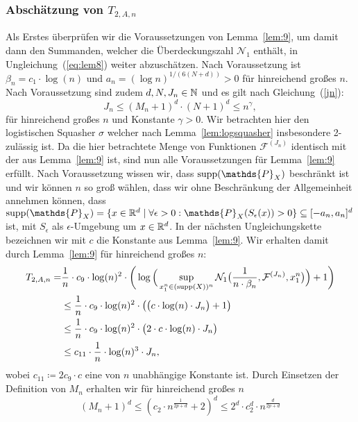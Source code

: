 \subsubsection{Abschätzung von $T_{2,A,n}$}
Als Erstes überprüfen wir die Voraussetzungen von Lemma~\ref{lem:9}, um damit dann den Summanden, welcher die Überdeckungszahl $\mathcal{N}_1$ enthält, in Ungleichung~(\ref{eq:lem8}) weiter abzuschätzen.
Nach Voraussetzung ist $\beta_n = c_1 \cdot \log(n)$ und $a_n = (\log n)^{1/(6(N + d))} > 0$ für hinreichend großes $n$. Nach Voraussetzung sind zudem $d, N, J_n \in \mathbb{N}$ und es gilt nach Gleichung~(\ref{jn}): 
$$J_n \leq (M_n + 1)^d \cdot (N + 1)^d \leq n^{\gamma},$$
für hinreichend großes $n$ und Konstante $\gamma > 0$. Wir betrachten hier den logistischen Squasher $\sigma$ welcher nach Lemma~\ref{lem:logsquasher} insbesondere 2-zulässig ist. Da die hier betrachtete Menge von Funktionen $\mathcal{F}^{(J_n)}$ identisch mit der aus Lemma~\ref{lem:9} ist, sind nun alle Voraussetzungen für Lemma~\ref{lem:9} erfüllt. Nach Voraussetzung wissen wir, dass $\supp(\mathds{P}_X)$ beschränkt ist und wir können $n$ so groß wählen, dass wir ohne Beschränkung der Allgemeinheit annehmen können, dass $\supp(\mathds{P}_X) = \{x \in \R^d \mid \forall \epsilon > 0 : \mathds{P}_X(S_{\epsilon}(x)) > 0\} \subseteq [-a_n, a_n]^d$ ist, mit $S_{\epsilon}$ als $\epsilon$-Umgebung um $x \in \mathbb{R}^d$. In der nächsten Ungleichungskette bezeichnen wir mit $c$ die Konstante aus Lemma~\ref{lem:9}. Wir erhalten damit durch Lemma~\ref{lem:9} für hinreichend großes $n$:
\begin{equation}
\label{lem9sol}
\begin{split}
T_{2,A,n} = & \frac{1}{n} \cdot c_9 \cdot \log(n)^2 \cdot \bigg(\log\Big(\sup_{x_1^n \in (\operatorname{supp}(X))^n}\mathcal{N}_1\big(\frac{1}{n \cdot \beta_n},\mathcal{F}^{(J_n)},x_1^n\big)\Big) + 1\bigg) \\
& \leq \frac{1}{n} \cdot c_9 \cdot \log(n)^2 \cdot \big(\big(c \cdot \log(n) \cdot J_n \big) + 1\big) \\
& \leq \frac{1}{n} \cdot c_9 \cdot \log(n)^2 \cdot \big(2 \cdot c \cdot \log(n) \cdot J_n\big) \\
& \leq c_{11} \cdot \frac{1}{n} \cdot \log(n)^3 \cdot J_n,
\end{split}
\end{equation}
wobei $c_{11} \coloneqq 2 c_9 \cdot c$ eine von $n$ unabhängige Konstante ist.
Durch Einsetzen der Definition von $M_n$ erhalten wir für hinreichend großes $n$ 
$$
(M_n + 1)^d \leq (c_2 \cdot n^{\frac{1}{2p + d}} + 2)^d \leq 2^d \cdot c_2^d \cdot n^{\frac{d}{2p + d}}
$$
